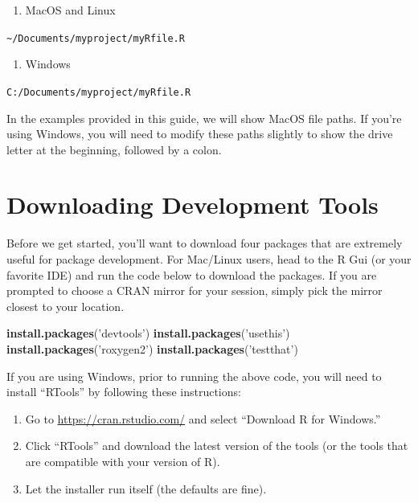 \documentclass[]{book}
\newenvironment{Shaded}{\begin{snugshade}}{\end{snugshade}}
\newcommand{\KeywordTok}[1]{\textcolor[rgb]{0.13,0.29,0.53}{\textbf{#1}}}
\newcommand{\StringTok}[1]{\textcolor[rgb]{0.31,0.60,0.02}{#1}}
\newcommand{\NormalTok}[1]{#1}
\providecommand{\tightlist}{%
  \setlength{\itemsep}{0pt}\setlength{\parskip}{0pt}}
\begin{document}
\begin{enumerate}
\def\labelenumi{\arabic{enumi}.}
\tightlist
\item
  MacOS and Linux
\end{enumerate}

\texttt{\textasciitilde{}/Documents/myproject/myRfile.R}

\begin{enumerate}
\def\labelenumi{\arabic{enumi}.}
\setcounter{enumi}{1}
\tightlist
\item
  Windows
\end{enumerate}

\texttt{C:/Documents/myproject/myRfile.R}

In the examples provided in this guide, we will show MacOS file paths.
If you're using Windows, you will need to modify these paths slightly to
show the drive letter at the beginning, followed by a colon.

\section{Downloading Development
Tools}\label{downloading-development-tools}

Before we get started, you'll want to download four packages that are
extremely useful for package development. For Mac/Linux users, head to
the R Gui (or your favorite IDE) and run the code below to download the
packages. If you are prompted to choose a CRAN mirror for your session,
simply pick the mirror closest to your location.

\begin{Shaded}
\begin{Highlighting}[]
\KeywordTok{install.packages}\NormalTok{(}\StringTok{'devtools'}\NormalTok{)}
\KeywordTok{install.packages}\NormalTok{(}\StringTok{'usethis'}\NormalTok{)}
\KeywordTok{install.packages}\NormalTok{(}\StringTok{'roxygen2'}\NormalTok{)}
\KeywordTok{install.packages}\NormalTok{(}\StringTok{'testthat'}\NormalTok{)}
\end{Highlighting}
\end{Shaded}

If you are using Windows, prior to running the above code, you will need
to install ``RTools'' by following these instructions:

\begin{enumerate}
\def\labelenumi{\arabic{enumi}.}
\item
  Go to \url{https://cran.rstudio.com/} and select ``Download R for
  Windows.''
\item
  Click ``RTools'' and download the latest version of the tools (or the
  tools that are compatible with your version of R).
\item
  Let the installer run itself (the defaults are fine).
\end{enumerate}
\end{document}
